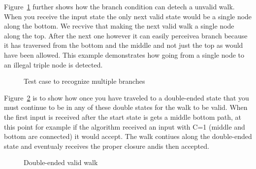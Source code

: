 Figure~\ref{fig:mult-branch} further shows how the branch condition can detech a unvalid walk. When you receive the input state the only next valid state would be a single node along the bottom. We recvive that making the next valid walk a single node along the top. After the next one however it can easily perceivea branch because it has traversed from the bottom and the middle and not just the top as would have been allowed. This example demonstrates how going from a single node to an illegal triple node is detected.
\begin{figure}[h!]
\begin{center}
\end{center}
\caption{Test case to recognize multiple branches}
\label{fig:mult-branch} 
\end{figure}

Figure~\ref{fig:double-ended} is to show how once you have traveled to a double-ended state that you must continue to be in any of these double states for the walk to be valid. When the first input is received after the start state is gets a middle bottom path, at this point for example if the algorithm received an input with C=1 (middle and bottom are connected) it would accept. The walk contiues along the double-ended state and eventualy receives the proper closure andis then accepted.
\begin{figure}[h!]
\begin{center}
\end{center}
\caption{Double-ended valid walk}
\label{fig:double-ended}
\end{figure}

